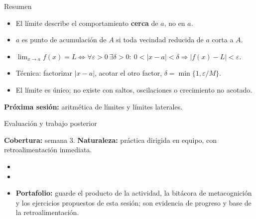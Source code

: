 \documentclass[10pt,aspectratio=169]{beamer}
\begin{document}
\begin{frame}{Resumen}
  \begin{itemize}
    \item El límite describe el comportamiento \textbf{cerca} de $a$, no en $a$.
    \item $a$ es punto de acumulación de $A$ si toda vecindad reducida de $a$ corta a $A$.
    \item $\lim_{x\to a}f(x)=L\iff\forall\varepsilon>0\ \exists\delta>0:\ 0<|x-a|<\delta\Rightarrow|f(x)-L|<\varepsilon$.
    \item Técnica: factorizar $|x-a|$, acotar el otro factor, $\delta=\min\{1,\varepsilon/M\}$.
    \item El límite es único; no existe con saltos, oscilaciones o crecimiento no acotado.
  \end{itemize}
  \vspace{3mm}
  \textbf{Próxima sesión:} aritmética de límites y límites laterales.
\end{frame}


\begin{frame}{Evaluación y trabajo posterior}
  \small
  \begin{evalbox}
    \textbf{Cobertura:} semana 3. \textbf{Naturaleza:} práctica dirigida en equipo, con retroalimentación inmediata.
  \end{evalbox}
  \begin{itemize}
    \item \criterios
    \item \declaracionia
    \item \textbf{Portafolio:} guarde el producto de la actividad, la bitácora de metacognición y los ejercicios propuestos de esta sesión; son evidencia de progreso y base de la retroalimentación.
  \end{itemize}
\end{frame}
\end{document}
